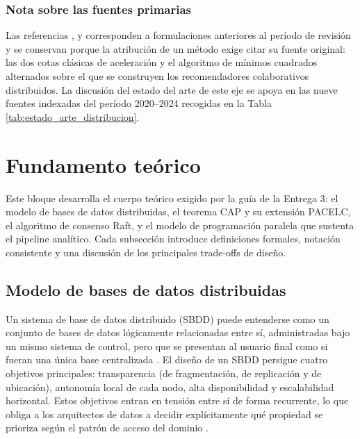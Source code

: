 \documentclass[12pt]{article}
\begin{document}
    \subsubsection*{Nota sobre las fuentes primarias}

    Las referencias \cite{amdahl1967}, \cite{gustafson1988} y \cite{zhou2008} corresponden a formulaciones anteriores al período de revisión y se conservan porque la atribución de un método exige citar su fuente original: las dos cotas clásicas de aceleración y el algoritmo de mínimos cuadrados alternados sobre el que se construyen los recomendadores colaborativos distribuidos. La discusión del estado del arte de este eje se apoya en las nueve fuentes indexadas del período 2020--2024 recogidas en la Tabla \ref{tab:estado_arte_distribucion}.

 \section{Fundamento teórico}
    \label{sec:fundamento-teorico}

    Este bloque desarrolla el cuerpo teórico exigido por la guía de la Entrega 3: el modelo de bases de datos distribuidas, el teorema CAP y su extensión PACELC, el algoritmo de consenso Raft, y el modelo de programación paralela que sustenta el pipeline analítico. Cada subsección introduce definiciones formales, notación consistente y una discusión de los principales trade-offs de diseño.

    \subsection{Modelo de bases de datos distribuidas}
    \label{sec:modelo-bdd}

    Un sistema de base de datos distribuido (SBDD) puede entenderse como un conjunto de bases de datos lógicamente relacionadas entre sí, administradas bajo un mismo sistema de control, pero que se presentan al usuario final como si fueran una única base centralizada \parencite{ozsu2020principles}. El diseño de un SBDD persigue cuatro objetivos principales: transparencia (de fragmentación, de replicación y de ubicación), autonomía local de cada nodo, alta disponibilidad y escalabilidad horizontal. Estos objetivos entran en tensión entre sí de forma recurrente, lo que obliga a los arquitectos de datos a decidir explícitamente qué propiedad se prioriza según el patrón de acceso del dominio \parencite{abdelhafiz2020distributed}.
\end{document}
